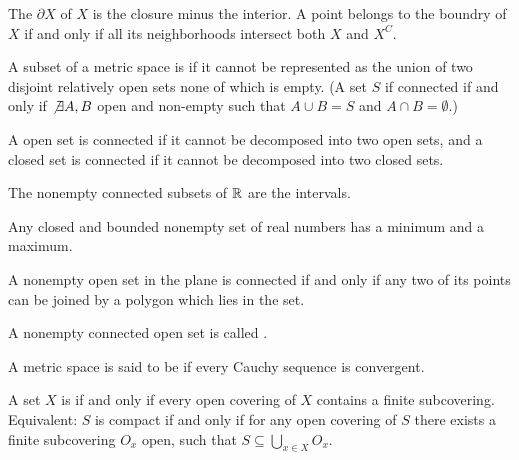 \begin{definition}[Boundry]
    The  $\partial X$ of $X$ is the closure minus the interior. A point belongs to the
    boundry of $X$ if and only if all its neighborhoods intersect both $X$ and $X^C$.
\end{definition}

\begin{definition}[Connectedness]
    A subset of a metric space is  if it cannot be represented as the
    union of two disjoint relatively open sets none of which is empty.
    (A set $S$ if connected if and only if $\not\exists A,B$ open and non-empty such
    that $A \cup B = S$ and $A \cap B = \emptyset$.)
\end{definition}

\begin{theorem}
    A open set is connected if it cannot be decomposed into two open sets, and a
    closed set is connected if it cannot be decomposed into two closed sets.
\end{theorem}

\begin{theorem}
    The nonempty connected subsets of $\mathbb{R}$ are the intervals.
\end{theorem}

\begin{theorem}
    Any closed and bounded nonempty set of real numbers has a minimum and a maximum.
\end{theorem}

\begin{theorem}
    A nonempty open set in the plane is connected if and only if any two of its
    points can be joined by a polygon which lies in the set.
\end{theorem}

\begin{definition}[Region]
    A nonempty connected open set is called .
\end{definition}

\begin{definition}[Completeness]
    A metric space is said to be  if every Cauchy sequence is convergent.
\end{definition}

\begin{definition}[Compactness]
    A set $X$ is  if and only if every open covering of $X$ contains
    a finite subcovering. Equivalent: $S$ is compact if and only if for any open
    covering of $S$ there exists a finite subcovering $O_x$ open, such that
    $S \subseteq \bigcup_{x \in X} O_x$.
\end{definition}

